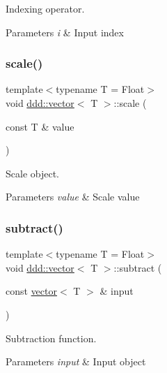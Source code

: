 Indexing operator. 


\begin{DoxyParams}{Parameters}
{\em i} & Input index \\
\hline
\end{DoxyParams}
\mbox{\label{classddd_1_1vector_a958883e517d457e63d62be46580db5a0}} 
\subsubsection{\texorpdfstring{scale()}{scale()}}
{\footnotesize\ttfamily template$<$typename T = Float$>$ \\
void \hyperlink{classddd_1_1vector}{ddd\+::vector}$<$ T $>$\+::scale (\begin{DoxyParamCaption}\item[{const T \&}]{value }\end{DoxyParamCaption})\hspace{0.3cm}{\ttfamily [inline]}}



Scale object. 


\begin{DoxyParams}{Parameters}
{\em value} & Scale value \\
\hline
\end{DoxyParams}
\mbox{\label{classddd_1_1vector_abf367c7da55ad2c770a90a3ed3c01d5a}} 
\subsubsection{\texorpdfstring{subtract()}{subtract()}}
{\footnotesize\ttfamily template$<$typename T = Float$>$ \\
void \hyperlink{classddd_1_1vector}{ddd\+::vector}$<$ T $>$\+::subtract (\begin{DoxyParamCaption}\item[{const \hyperlink{classddd_1_1vector}{vector}$<$ T $>$ \&}]{input }\end{DoxyParamCaption})\hspace{0.3cm}{\ttfamily [inline]}}



Subtraction function. 


\begin{DoxyParams}{Parameters}
{\em input} & Input object \\
\hline
\end{DoxyParams}
\mbox{\label{classddd_1_1vector_a3a431ffa7d2681cf26f6b2dd5052de65}} 
